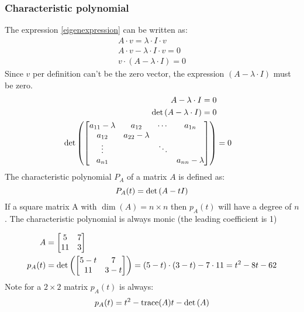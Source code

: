\subsubsection{Characteristic polynomial}
The expression \ref{eigenexpression} can be written as:
\begin{align}
    A\cdot v = \lambda \cdot I \cdot v \tag*{Multiplying with identity Matrix} \\
    A \cdot v - \lambda \cdot I \cdot v = 0                                    \\
    v \cdot (A - \lambda \cdot I) = 0
\end{align}
Since \(v\) per definition can't be the zero vector, the expression \( (A - \lambda \cdot I) \) must be zero.
\begin{align*}
    A - \lambda \cdot I = 0                 \\
    \det \left(  A - \lambda \cdot I  \right) = 0 \\
    \det \left( 
        \begin{bmatrix}
            a_{11} - \lambda & a_{12}           & \cdots & a_{1n}           \\
            a_{12}           & a_{22} - \lambda &        &                  \\
            \vdots           &                  & \ddots &                  \\
            a_{n1}           &                  &        & a_{nn} - \lambda
        \end{bmatrix}
     \right) & = 0
\end{align*}
The characteristic polynomial \( P_{A}\) of a matrix \(A\) is defined as:
\begin{equation}
    P_A(t) = \det \left( A - t I \right)
\end{equation}
If a square matrix A with \( \dim(A) = n \times n \) then \(p_A(t)\) will have a degree of \(n\). The characteristic polynomial is always monic (the leading coefficient is 1)
\begin{example}\label{eigenexample}
    \begin{align*}
        A      & = \begin{bmatrix}
            5 & 7 \\ 11 & 3
        \end{bmatrix}                                                                    \\
        p_A(t) & = \det \left( \begin{bmatrix}
                5 - t & 7 \\ 11 & 3 -t
            \end{bmatrix} \right) = (5 - t) \cdot (3 - t) - 7 \cdot 11 = t^2 - 8t - 62
    \end{align*}
    Note for a \(2 \times 2 \) matrix \( p_A(t) \) is always:
    \begin{equation}
        p_A(t) = t^2 - \operatorname{trace}(A) t - \det \left( A \right)
    \end{equation}
\end{example}
